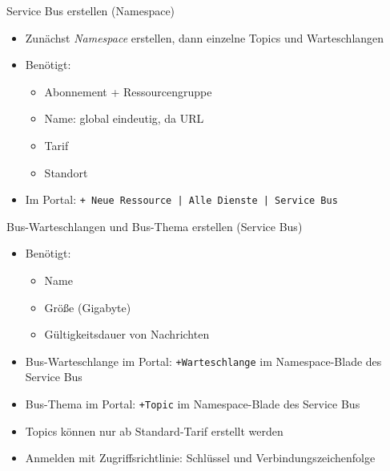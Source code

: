 \begin{flashcard}[Definition]{Service Bus erstellen (Namespace)}
    \begin{itemize}
        \item Zunächst \emph{Namespace} erstellen, dann einzelne Topics und Warteschlangen
        \item Benötigt:
            \begin{itemize}
                \item Abonnement + Ressourcengruppe
                \item Name: global eindeutig, da URL
                \item Tarif
                \item Standort
            \end{itemize}
        \item Im Portal: \texttt{+ Neue Ressource | Alle Dienste | Service Bus}
    \end{itemize}
\end{flashcard}

\begin{flashcard}[Definition]{Bus-Warteschlangen und Bus-Thema erstellen (Service Bus)}
    \begin{itemize}
        \item Benötigt:
            \begin{itemize}
                \item Name
                \item Größe (Gigabyte)
                \item Gültigkeitsdauer von Nachrichten
            \end{itemize}
        \item Bus-Warteschlange im Portal:\newline
            \texttt{+Warteschlange} im Namespace-Blade des Service Bus
        \item Bus-Thema im Portal:\newline
            \texttt{+Topic} im Namespace-Blade des Service Bus
        \item Topics können nur ab Standard-Tarif erstellt werden
        \item Anmelden mit Zugriffsrichtlinie: Schlüssel und Verbindungszeichenfolge
    \end{itemize}
\end{flashcard}

